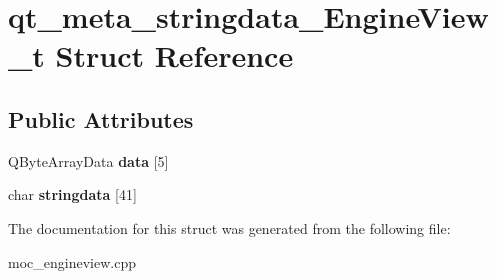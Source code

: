 \hypertarget{structqt__meta__stringdata__EngineView__t}{\section{qt\-\_\-meta\-\_\-stringdata\-\_\-\-Engine\-View\-\_\-t Struct Reference}
\label{structqt__meta__stringdata__EngineView__t}
}
\subsection*{Public Attributes}
\begin{DoxyCompactItemize}
\item 
\hypertarget{structqt__meta__stringdata__EngineView__t_a0fc4ba2dbd4cabefd21bcf6db7f30d14}{Q\-Byte\-Array\-Data {\bfseries data} \mbox{[}5\mbox{]}}\label{structqt__meta__stringdata__EngineView__t_a0fc4ba2dbd4cabefd21bcf6db7f30d14}

\item 
\hypertarget{structqt__meta__stringdata__EngineView__t_a7fdcb63f2a0df9e67bac41015aadfa97}{char {\bfseries stringdata} \mbox{[}41\mbox{]}}\label{structqt__meta__stringdata__EngineView__t_a7fdcb63f2a0df9e67bac41015aadfa97}

\end{DoxyCompactItemize}


The documentation for this struct was generated from the following file\-:\begin{DoxyCompactItemize}
\item 
moc\-\_\-engineview.\-cpp\end{DoxyCompactItemize}
